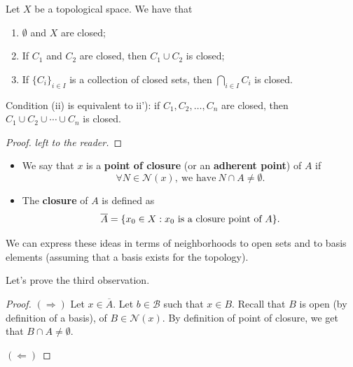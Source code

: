 \begin{prop}
    Let \( X  \) be a topological space. We have that 
    \begin{enumerate}
        \item[(i)] \( \emptyset  \) and \( X  \) are closed;
        \item[(ii)] If \( {C}_{1} \) and \( {C}_{2} \) are closed, then \( {C}_{1} \cup {C}_{2} \) is closed;
        \item[(iii)] If \( \{ {C}_{i} \}_{i \in I }  \) is a collection of closed sets, then \( \bigcap_{  i \in I  }^{  }  {C}_{i} \) is closed.
\end{enumerate}
\begin{remark}
    Condition (ii) is equivalent to ii'): if \( {C}_{1}, {C}_{2}, \dots, {C}_{n} \) are closed, then \( {C}_{1} \cup {C}_{2} \cup \cdots \cup {C}_{n} \) is closed.
\end{remark}
\end{prop}
\begin{proof}
\textit{left to the reader.} 
\end{proof}

\begin{definition}
    \begin{itemize}
        \item We say that \( x  \) is a \textbf{point of closure} (or an \textbf{adherent point}) of \( A  \) if
            \[  \forall N \in \mathcal{N}(x), \ \text{we have} \ N \cap A \neq \emptyset.  \]
        \item The \textbf{closure} of \( A  \) is defined as
            \[  \overline{A} = \{ {x}_{0} \in X : {x}_{0} \ \text{is a closure point of \( A  \)} \}. \]
    \end{itemize}
\end{definition}

\begin{remark}
    We can express these ideas in terms of neighborhoods to open sets and to basis elements (assuming that a basis exists for the topology).
\end{remark}

Let's prove the third observation.

\begin{proof}
\( (\Longrightarrow) \) Let \( x \in \overline{A} \). Let \( b \in \mathcal{B} \) such that \( x \in B \). Recall that \( B \) is open (by definition of a basis), of \( B \in \mathcal{N}(x) \). By definition of point of closure, we get that \( B \cap A \neq \emptyset  \).

\( (\Longleftarrow) \) 
\end{proof}

